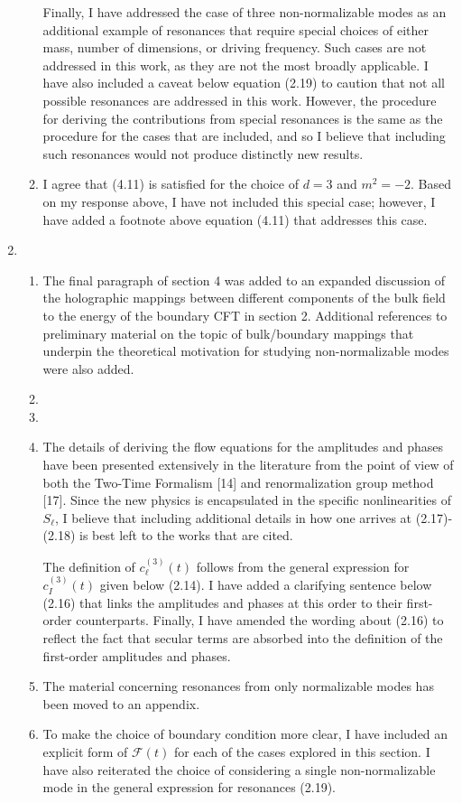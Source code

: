 \documentclass[11pt,letterpaper]{article}
\newcommand{\mc}{\mathcal}
\begin{document}
\begin{enumerate}
\begin{enumerate}
        Finally, I have addressed the case of three non-normalizable modes as an additional example of resonances that require special choices of either mass, number of dimensions, or driving frequency. Such cases are not addressed in this work, as they are not the most broadly applicable. I have also included a caveat below equation (2.19) to caution that not all possible resonances are addressed in this work. However, the procedure for deriving the contributions from special resonances is the same as the procedure for the cases that are included, and so I believe that including such resonances would not produce distinctly new results.
        \item I agree that (4.11) is satisfied for the choice of $d=3$ and $m^2 = -2$. Based on my response above, I have not included this special case; however, I have added a footnote above equation (4.11)  that addresses this case.
    \end{enumerate}
    \item %
    \begin{enumerate}
        \item The final paragraph of section 4 was added to an expanded discussion of the holographic mappings
        between different components of the bulk field to the energy of the boundary CFT in section 2. Additional
        references to preliminary material on the topic of bulk/boundary mappings that underpin the 
        theoretical motivation for studying non-normalizable modes were also added.
        \item 
        \item 
        \item The details of deriving the flow equations for the amplitudes and phases have been presented extensively in the literature from the point of view of both the Two-Time Formalism [14] and renormalization group method [17]. Since the new physics is encapsulated in the specific nonlinearities of $S_\ell$, I believe that including additional details in how one arrives at (2.17)-(2.18) is best left to the works that are cited. 
        
        The definition of $c^{(3)}_\ell (t)$ follows from the general expression for $c_I^{(3)}(t)$ given below (2.14). I have added a clarifying sentence below (2.16) that links the amplitudes and phases at this order to their first-order counterparts.
        Finally, I have amended the wording about (2.16) to reflect the fact that secular terms are absorbed into the definition of the first-order amplitudes and phases. 
        \item The material concerning resonances from only normalizable modes has been moved to an appendix.
        \item To make the choice of boundary condition more clear, I have included an explicit form of $\mc F(t)$ for each of the cases explored in this section. I have also reiterated the choice of considering a single non-normalizable mode in the general expression for resonances (2.19).
        

\end{enumerate}
\end{enumerate}
\end{document}
